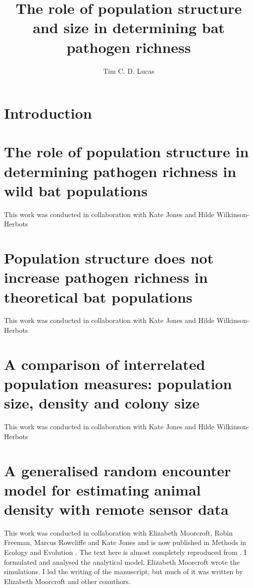 \documentclass[11pt,phd,a4paper,oneside]{stanley}
\title{The role of population structure and size in determining bat pathogen richness}
\author{Tim C. D. Lucas}
\begin{document}



\chapter{Introduction}
\label{ch:intro}


\chapter{The role of population structure in determining pathogen richness in wild bat populations}{This work was conducted in collaboration with Kate Jones and Hilde Wilkinson-Herbots}


\label{ch:empirical}


\chapter{Population structure does not increase pathogen richness in theoretical bat populations}{This work was conducted in collaboration with Kate Jones and Hilde Wilkinson-Herbots}
\label{ch:sims1}


\chapter{A comparison of interrelated population measures: population size, density and colony size}{This work was conducted in collaboration with Kate Jones and Hilde Wilkinson-Herbots}
\label{ch:sims2}



\chapter{A generalised random encounter model for estimating animal density with remote sensor data}{
This work was conducted in collaboration with Elizabeth Moorcroft, Robin Freeman, Marcus Rowcliffe and Kate Jones and is now published in Methods in Ecology and Evolution \cite{lucas2015generalised}.
The text here is almost completely reproduced from \textcite{lucas2015generalised}.
I formulated and analysed the analytical model.
Elizabeth Moorcroft wrote the simulations.
I led the writing of the manuscript, but much of it was written by Elizabeth Moorcroft and other coauthors.
}
\label{ch:grem}

\end{document}

